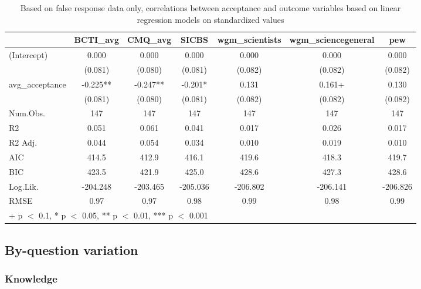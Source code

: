 \documentclass[
  doc,floatsintext]{apa6}
\begin{document}
\begin{table}

\caption{\label{tab:exp2-false-response-regression}Based on false response data only, correlations between acceptance and outcome variables based on linear regression models on standardized values}
\centering
\begin{tabular}[t]{lcccccc}
\toprule
  & BCTI\_avg & CMQ\_avg & SICBS & wgm\_scientists & wgm\_sciencegeneral & pew\\
\midrule
(Intercept) & 0.000 & 0.000 & 0.000 & 0.000 & 0.000 & 0.000\\
 & (0.081) & (0.080) & (0.081) & (0.082) & (0.082) & \vphantom{1} (0.082)\\
avg\_acceptance & -0.225** & -0.247** & -0.201* & 0.131 & 0.161+ & 0.130\\
 & (0.081) & (0.080) & (0.081) & (0.082) & (0.082) & (0.082)\\
\midrule
Num.Obs. & 147 & 147 & 147 & 147 & 147 & 147\\
R2 & 0.051 & 0.061 & 0.041 & 0.017 & 0.026 & 0.017\\
R2 Adj. & 0.044 & 0.054 & 0.034 & 0.010 & 0.019 & 0.010\\
AIC & 414.5 & 412.9 & 416.1 & 419.6 & 418.3 & 419.7\\
BIC & 423.5 & 421.9 & 425.0 & 428.6 & 427.3 & 428.6\\
Log.Lik. & -204.248 & -203.465 & -205.036 & -206.802 & -206.141 & -206.826\\
RMSE & 0.97 & 0.97 & 0.98 & 0.99 & 0.98 & 0.99\\
\bottomrule
\multicolumn{7}{l}{\rule{0pt}{1em}+ p $<$ 0.1, * p $<$ 0.05, ** p $<$ 0.01, *** p $<$ 0.001}\\
\end{tabular}
\end{table}

\subsection{By-question variation}\label{by-question-variation-1}

\subsubsection{Knowledge}\label{knowledge-1}
\end{document}

